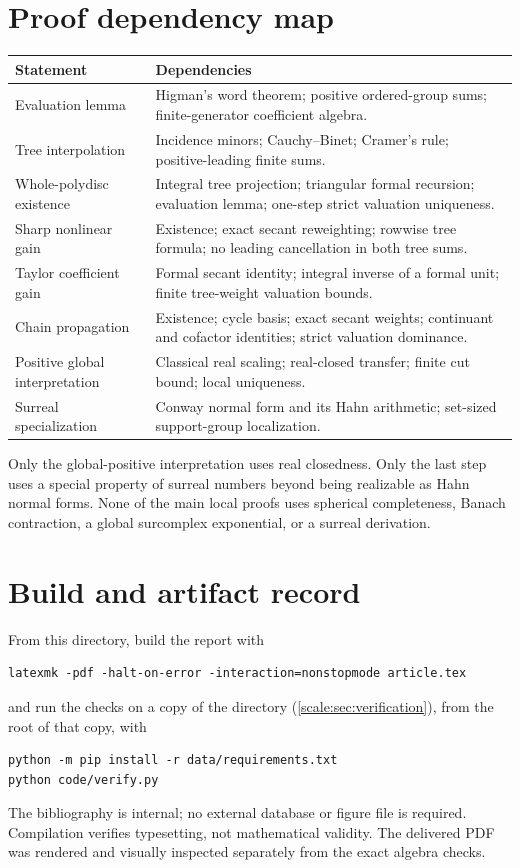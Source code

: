 \documentclass[11pt,a4paper]{article}
\numberwithin{equation}{section}
\theoremstyle{definition}
\begin{document}
\section{Proof dependency map}\label{scale:app:dependencies}
\begin{center}
\begin{tabular}{@{}L{0.31\textwidth}L{0.61\textwidth}@{}}
\toprule
Statement & Dependencies\\
\midrule
Evaluation lemma &
Higman's word theorem; positive ordered-group sums;
finite-generator coefficient algebra.\\[3pt]
Tree interpolation &
Incidence minors; Cauchy--Binet; Cramer's rule;
positive-leading finite sums.\\[3pt]
Whole-polydisc existence &
Integral tree projection; triangular formal recursion;
evaluation lemma; one-step strict valuation uniqueness.\\[3pt]
Sharp nonlinear gain &
Existence; exact secant reweighting; rowwise tree formula;
no leading cancellation in both tree sums.\\[3pt]
Taylor coefficient gain &
Formal secant identity; integral inverse of a formal unit;
finite tree-weight valuation bounds.\\[3pt]
Chain propagation &
Existence; cycle basis; exact secant weights; continuant
and cofactor identities; strict valuation dominance.\\[3pt]
Positive global interpretation &
Classical real scaling; real-closed transfer; finite cut bound;
local uniqueness.\\[3pt]
Surreal specialization &
Conway normal form and its Hahn arithmetic;
set-sized support-group localization.\\
\bottomrule
\end{tabular}
\end{center}
Only the global-positive interpretation uses real closedness. Only
the last step uses a special property of surreal numbers beyond
being realizable as Hahn normal forms. None of the main local
proofs uses spherical completeness, Banach contraction, a global
surcomplex exponential, or a surreal derivation.

\section{Build and artifact record}\label{scale:app:build}
From this directory, build the report with
\begin{verbatim}
latexmk -pdf -halt-on-error -interaction=nonstopmode article.tex
\end{verbatim}
and run the checks on a copy of the directory (\cref{scale:sec:verification}),
from the root of that copy, with
\begin{verbatim}
python -m pip install -r data/requirements.txt
python code/verify.py
\end{verbatim}
The bibliography is internal; no external database or figure file
is required. Compilation verifies typesetting,
not mathematical validity. The delivered PDF was rendered and
visually inspected separately from the exact algebra checks.
\end{document}
